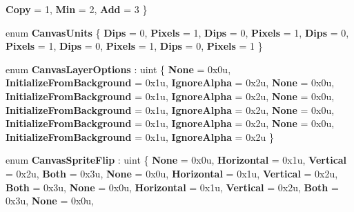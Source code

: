 \begin{DoxyCompactItemize}
{\bfseries Copy} = 1, 
{\bfseries Min} = 2, 
{\bfseries Add} = 3
 \}
\item 
\mbox{\label{namespace_microsoft_1_1_graphics_1_1_canvas_a42a64ab003f060d5bc514b2c0c2f9869}} 
enum {\bfseries Canvas\+Units} \{ \newline
{\bfseries Dips} = 0, 
{\bfseries Pixels} = 1, 
{\bfseries Dips} = 0, 
{\bfseries Pixels} = 1, 
\newline
{\bfseries Dips} = 0, 
{\bfseries Pixels} = 1, 
{\bfseries Dips} = 0, 
{\bfseries Pixels} = 1, 
\newline
{\bfseries Dips} = 0, 
{\bfseries Pixels} = 1
 \}
\item 
\mbox{\label{namespace_microsoft_1_1_graphics_1_1_canvas_a111054cba4b53759d62af260e252fe48}} 
enum {\bfseries Canvas\+Layer\+Options} \+: uint \{ \newline
{\bfseries None} = 0x0u, 
{\bfseries Initialize\+From\+Background} = 0x1u, 
{\bfseries Ignore\+Alpha} = 0x2u, 
{\bfseries None} = 0x0u, 
\newline
{\bfseries Initialize\+From\+Background} = 0x1u, 
{\bfseries Ignore\+Alpha} = 0x2u, 
{\bfseries None} = 0x0u, 
{\bfseries Initialize\+From\+Background} = 0x1u, 
\newline
{\bfseries Ignore\+Alpha} = 0x2u, 
{\bfseries None} = 0x0u, 
{\bfseries Initialize\+From\+Background} = 0x1u, 
{\bfseries Ignore\+Alpha} = 0x2u, 
\newline
{\bfseries None} = 0x0u, 
{\bfseries Initialize\+From\+Background} = 0x1u, 
{\bfseries Ignore\+Alpha} = 0x2u
 \}
\item 
\mbox{\label{namespace_microsoft_1_1_graphics_1_1_canvas_ab01b519fa39176572bedd129db922814}} 
enum {\bfseries Canvas\+Sprite\+Flip} \+: uint \{ \newline
{\bfseries None} = 0x0u, 
{\bfseries Horizontal} = 0x1u, 
{\bfseries Vertical} = 0x2u, 
{\bfseries Both} = 0x3u, 
\newline
{\bfseries None} = 0x0u, 
{\bfseries Horizontal} = 0x1u, 
{\bfseries Vertical} = 0x2u, 
{\bfseries Both} = 0x3u, 
\newline
{\bfseries None} = 0x0u, 
{\bfseries Horizontal} = 0x1u, 
{\bfseries Vertical} = 0x2u, 
{\bfseries Both} = 0x3u, 
\newline
{\bfseries None} = 0x0u, 

\end{DoxyCompactItemize}
